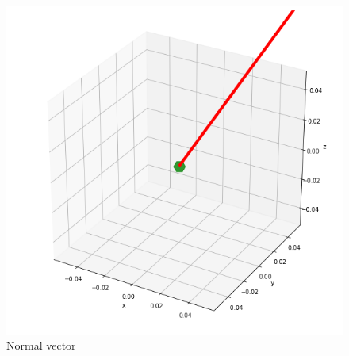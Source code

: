 \documentclass[journal,12pt,twocolumn]{IEEEtran}
\begin{document}
\begin{figure}[h!]
	\centering
	\includegraphics[width=\columnwidth]{normal.png}
	\caption{Normal vector}
	\label{myfig1}
\end{figure}
\end{document}
